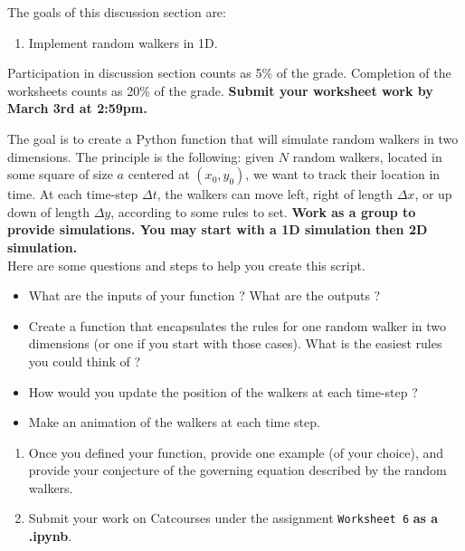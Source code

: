 \documentclass[11pt]{article}
\begin{document}
The goals of this discussion section are: 

\begin{enumerate}
\item Implement random walkers in 1D.
\end{enumerate}

Participation in discussion section counts as 5\% of the grade. Completion of the worksheets counts as 20\% of the grade. \textbf{Submit your worksheet work by March 3rd at 2:59pm.}


The goal is to create a Python function that will simulate random walkers in two dimensions. The principle is the following: given $N$ random walkers, located in some square of size $a$ centered at $(x_0,y_0)$, we want to track their location in time. At each time-step $\Delta t$, the walkers can move left, right of length $\Delta x$, or up down of length $\Delta y$, according to some rules to set. \textbf{Work as a group to provide simulations. You may start with a 1D simulation then 2D simulation.}\\ 

Here are some questions and steps to help you create this script.
\begin{itemize}
\item What are the inputs of your function ? What are the outputs ?
\item Create a function that encapsulates the rules for one random walker in two dimensions (or one if you start with those cases). What is the easiest rules you could think of ?
\item How would you update the position of the walkers at each time-step ?
\item Make an animation of the walkers at each time step.
\end{itemize}

\begin{enumerate}
\item Once you defined your function, provide one example (of your choice), and provide your conjecture of the governing equation described by the random walkers. 
\item Submit your work on Catcourses under the assignment \texttt{Worksheet 6} \textbf{as a .ipynb}. 
\end{enumerate}
\end{document}
